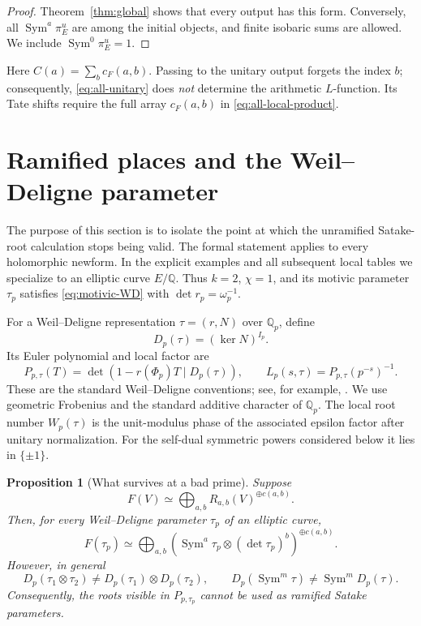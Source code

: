 \documentclass[11pt,reqno]{amsart}
\newtheorem{proposition}[theorem]{Proposition}
\theoremstyle{definition}
\theoremstyle{remark}
\newcommand{\Q}{\mathbb Q}
\newcommand{\Sym}{\operatorname{Sym}}
\begin{document}
\begin{proof}
Theorem~\ref{thm:global} shows that every output has this form.  Conversely,
all $\Sym^a\pi_E^u$ are among the initial objects, and finite isobaric sums are
allowed.  We include $\Sym^0\pi_E^u=1$.
\end{proof}

Here $C(a)=\sum_b c_F(a,b)$.  Passing to the unitary output forgets the
index $b$; consequently, \eqref{eq:all-unitary} does \emph{not} determine
the arithmetic $L$-function.  Its Tate shifts require the full array
$c_F(a,b)$ in \eqref{eq:all-local-product}.

\section{Ramified places and the Weil--Deligne parameter}\label{sec:ramified}

The purpose of this section is to isolate the point at which the unramified
Satake-root calculation stops being valid.  The formal statement applies to
every holomorphic newform.  In the explicit examples and all subsequent local
tables we specialize to an elliptic curve $E/\Q$.  Thus $k=2$, $\chi=1$, and
its motivic parameter $\tau_p$ satisfies \eqref{eq:motivic-WD} with
$\det r_p=\omega_p^{-1}$.

For a Weil--Deligne representation $\tau=(r,N)$ over $\Q_p$, define
\begin{equation}\label{eq:Dfunctor}
 D_p(\tau)=(\ker N)^{I_p}.
\end{equation}
Its Euler polynomial and local factor are
\begin{equation}\label{eq:euler-definition}
 P_{p,\tau}(T)=
 \det\left(1-r(\Phi_p)T\mid D_p(\tau)\right),
 \qquad
 L_p(s,\tau)=P_{p,\tau}(p^{-s})^{-1}.
\end{equation}
These are the standard Weil--Deligne conventions; see, for example,
\cite{Rohrlich}.
We use geometric Frobenius and the standard additive character of $\Q_p$.
The local root number $W_p(\tau)$ is the unit-modulus phase of the associated
epsilon factor after unitary normalization.  For the self-dual symmetric
powers considered below it lies in $\{\pm1\}$.

\begin{proposition}[What survives at a bad prime]\label{prop:WD-decomposition}
Suppose
\begin{equation*}
 F(V)\simeq
 \bigoplus_{a,b}R_{a,b}(V)^{\oplus c(a,b)}.
\end{equation*}
Then, for every Weil--Deligne parameter $\tau_p$ of an elliptic curve,
\begin{equation}\label{eq:WD-F-decomp}
 F(\tau_p)\simeq
 \bigoplus_{a,b}
 \left(\Sym^a\tau_p\otimes(\det\tau_p)^b\right)^{\oplus c(a,b)}.
\end{equation}
However, in general
\begin{equation}\label{eq:D-not-monoidal}
 D_p(\tau_1\otimes\tau_2)\neq D_p(\tau_1)\otimes D_p(\tau_2),
 \qquad
 D_p(\Sym^m\tau)\neq\Sym^mD_p(\tau).
\end{equation}
Consequently, the roots visible in $P_{p,\tau_p}$ cannot be used as ramified
Satake parameters.
\end{proposition}
\end{document}
